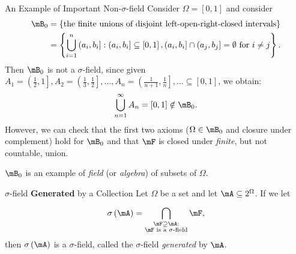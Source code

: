 \documentclass[stat901]{subfiles}
\begin{document}
    \begin{example}{An Example of Important Non-$\sigma$-field}
        Consider $\Omega = \left[ 0,1 \right]$ and consider
        \begin{equation*}
            \begin{aligned}
                \mB_0 & = \left\lbrace \text{the finite unions of disjoint left-open-right-closed intervals} \right\rbrace \\
                      & = \left\lbrace \bigcup^{n}_{i=1} \left( a_i,b_i \right]: \left( a_i,b_i \right]\subseteq \left[ 0,1 \right], \left( a_i,b_i \right]\cap \left( a_j,b_j \right]=\emptyset\text{ for $i\neq j$} \right\rbrace.
            \end{aligned} 
        \end{equation*}
        Then $\mB_0$ is not a $\sigma$-field, since given $A_1 = \left( \frac{1}{2},1 \right], A_2 = \left( \frac{1}{3},\frac{1}{2} \right], \ldots, A_n = \left( \frac{1}{n+1},\frac{1}{n} \right], \ldots\subseteq \left[ 0,1 \right]$, we obtain:
        \begin{equation*}
            \bigcup^{\infty}_{n=1} A_n = \left[ 0,1 \right] \notin\mB_0.
        \end{equation*}
        However, we can check that the first two axioms ($\Omega\in\mB_0$ and closure under complement) hold for $\mB_0$ and that $\mF$ is closed under \textit{finite}, but not countable, union.

        $\mB_0$ is an example of \emph{field} (or \emph{algebra}) of subsets of $\Omega$.
    \end{example}

    \rruleline

    \begin{definition}{$\sigma$-field \textbf{Generated} by a Collection}
        Let $\Omega$ be a set and let $\mA\subseteq 2^{\Omega}$. If we let
        \begin{equation*}
            \sigma\left( \mA \right) = \bigcap^{}_{\substack{\mF\supseteq\mA:\\\text{$\mF$ is a $\sigma$-field}}} \mF,
        \end{equation*}
        then $\sigma\left( \mA \right)$ is a $\sigma$-field, called the $\sigma$-field \emph{generated} by $\mA$.
    \end{definition}

    \clearpage
\end{document}
